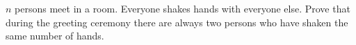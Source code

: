 $n$ persons meet in a room. Everyone shakes hands with everyone else. Prove that during the greeting ceremony there are always two persons who have shaken the same number of hands.
